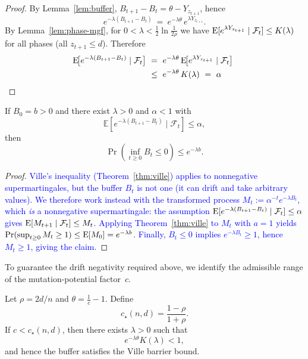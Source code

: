 \begin{proof}
	By Lemma~\ref{lem:buffer}, $B_{t+1}-B_t=\theta-Y_{z_{t+1}}$, hence
	\[
	e^{-\lambda(B_{t+1}-B_t)}\ =\ e^{-\lambda\theta}\,e^{\lambda Y_{z_{t+1}}}.
	\]
	By Lemma~\ref{lem:phase-mgf}, for $0<\lambda<\tfrac12\ln\!\tfrac{1}{2\rho}$ we have %
	$\text{E}[e^{\lambda Y_{z_{t+1}}}\mid\mathcal F_t]\le K(\lambda)$ for all phases (all $z_{t+1}\le d$). Therefore
	\begin{align*}
		\text{E}\!\big[e^{-\lambda(B_{t+1}-B_t)}\mid \mathcal F_t\big]
		\ &=\ e^{-\lambda\theta}\,\text{E}\!\big[e^{\lambda Y_{z_{t+1}}}\mid\mathcal F_t\big]
		\ \\ &\le\ e^{-\lambda\theta}\,K(\lambda)
		\ =\ \alpha	
	\end{align*}
\end{proof}



\begin{corollary}
	\label{cor:ville-exponential}
	
	If $B_0=b>0$ and there exist $\lambda>0$ and $\alpha<1$ with
	\[
	\mathbb{E}[e^{-\lambda(B_{t+1}-B_t)}\mid\mathcal{F}_t]\le\alpha,
	\]
	then
	\[
	\Pr\!\left(\inf_{t\ge0} B_t \le 0\right) \le e^{-\lambda b}.
	\]
\end{corollary}

\begin{proof}
	\textcolor{blue}{Ville's inequality (Theorem~\ref{thm:ville}) applies to nonneg\-ative
	supermartingales, but the buffer $B_t$ is not one (it can drift and take
	arbitrary values).  We therefore work instead with the transformed process
	$M_t := \alpha^{-t}e^{-\lambda B_t}$, which \emph{is} a nonneg\-ative
	supermartingale: the assumption $\text{E}[e^{-\lambda(B_{t+1}-B_t)}\mid\mathcal F_t]
	\le \alpha$ gives $\text{E}[M_{t+1}\mid\mathcal F_t]\le M_t$.
	Applying Theorem~\ref{thm:ville} to $M_t$ with $a=1$ yields
	$\Pr(\sup_{t\ge 0} M_t\ge 1)\le \text{E}[M_0]=e^{-\lambda b}$.
	Finally, $B_t\le 0$ implies $e^{-\lambda B_t}\ge 1$, hence $M_t\ge 1$,
	giving the claim.}
	
\end{proof}


To guarantee the drift negativity required above, we identify the admissible 
range of the mutation-potential factor~$c$.

\begin{lemma}%
	 \label{lem:c-threshold-instance}
	
	Let $\rho=2d/n$ and $\theta=\frac{1}{c}-1$.  
	Define
	\[
	c_\star(n,d)=\frac{1-\rho}{1+\rho}.
	\]
	If $c<c_\star(n,d)$, then there exists $\lambda>0$ such that
	\[
	e^{-\lambda\theta}K(\lambda) < 1,
	\]
	and hence the buffer satisfies the Ville barrier bound.
\end{lemma}

